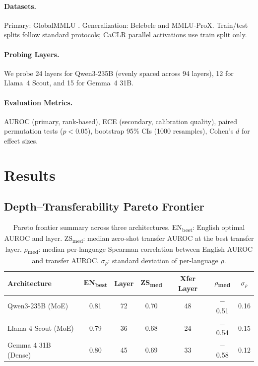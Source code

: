 \documentclass[11pt,a4paper]{article}
\begin{document}
\paragraph{Datasets.}
Primary: GlobalMMLU \cite{ahuja2024globalmmlu}. Generalization: Belebele \cite{bandarkar2023belebele} and MMLU-ProX. Train/test splits follow standard protocols; CaCLR parallel activations use train split only.

\paragraph{Probing Layers.}
We probe 24 layers for Qwen3-235B (evenly spaced across 94 layers), 12 for Llama~4 Scout, and 15 for Gemma~4 31B.

\paragraph{Evaluation Metrics.}
AUROC (primary, rank-based), ECE (secondary, calibration quality), paired permutation tests ($p < 0.05$), bootstrap 95\% CIs (1000 resamples), Cohen's $d$ for effect sizes.

\section{Results}
\label{sec:results}

\subsection{Depth--Transferability Pareto Frontier}
\label{sec:pareto}

\begin{table}[t]
\centering
\small
\caption{Pareto frontier summary across three architectures. EN\textsubscript{best}: English optimal AUROC and layer. ZS\textsubscript{med}: median zero-shot transfer AUROC at the best transfer layer. $\rho$\textsubscript{med}: median per-language Spearman correlation between English AUROC and transfer AUROC. $\sigma_\rho$: standard deviation of per-language $\rho$.}
\label{tab:pareto_summary}
\begin{tabular}{lcccccc}
\toprule
\textbf{Architecture} & \textbf{EN\textsubscript{best}} & \textbf{Layer} & \textbf{ZS\textsubscript{med}} & \textbf{Xfer Layer} & \textbf{$\rho$\textsubscript{med}} & \textbf{$\sigma_\rho$} \\
\midrule
Qwen3-235B (MoE) & 0.81 & 72 & 0.70 & 48 & $-$0.51 & 0.16 \\
Llama 4 Scout (MoE) & 0.79 & 36 & 0.68 & 24 & $-$0.54 & 0.15 \\
Gemma 4 31B (Dense) & 0.80 & 45 & 0.69 & 33 & $-$0.58 & 0.12 \\
\bottomrule
\end{tabular}
\end{table}
\end{document}
